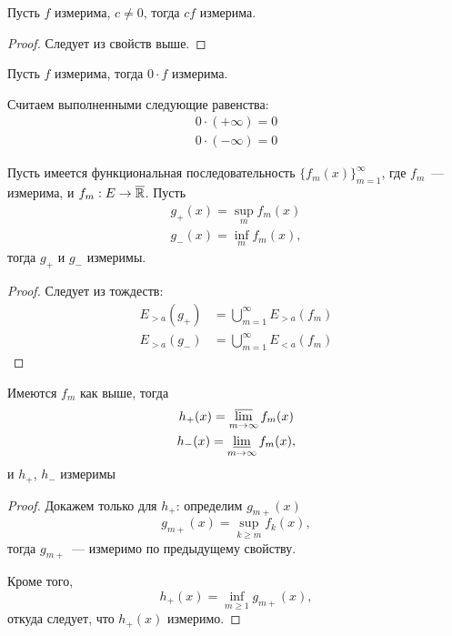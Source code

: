 \documentclass[main]{subfiles}
\begin{document}
\begin{property}
    Пусть $f$ измерима, $c \neq 0$, тогда $cf$ измерима.
\end{property}
\begin{proof}
    Следует из свойств выше.
\end{proof}

\begin{property}
    Пусть $f$ измерима, тогда $0 \cdot f$ измерима.
\end{property}

\begin{remark}
    Считаем выполненными следующие равенства:
    \begin{gather*}
        0 \cdot(+\infty) = 0\\
        0 \cdot(-\infty) = 0
    \end{gather*}
\end{remark}

\begin{property}
    Пусть имеется функциональная последовательность $\{f_m(x)\}_{m=1}^\infty$, где $f_m$~--- измерима, и $f_m: E \to \overline{\mathbb{R}}$.
    Пусть
    \begin{gather*}
        g_{+}(x) = \sup_{m} f_m(x) \\
        g_{-}(x) = \inf_{m} f_m(x),
    \end{gather*}
    тогда $g_+$ и $g_-$ измеримы.
\end{property}
\begin{proof}
    Следует из тождеств:
    \[\begin{aligned}
            E_{>a} (g_+) & = \bigcup_{m=1}^\infty E_{>a}(f_m) \\
            E_{>a} (g_-) & = \bigcup_{m=1}^\infty E_{<a}(f_m)
        \end{aligned}\tag{2}\]
\end{proof}

\begin{property}
    Имеются $f_m$ как выше, тогда
    \begin{gather*}
        h_+(x) = \varlimsup_{m \to \infty} f_m(x) \\
        h_-(x) = \varliminf_{m \to \infty} f_m(x),
    \end{gather*}
    и $h_+$, $h_-$ измеримы
\end{property}
\begin{proof}
    Докажем только для $h_+$: определим $g_{m+}(x)$
    \[g_{m+} (x) = \sup_{k\ge m} f_k(x),\]
    тогда $g_{m+}$~--- измеримо по предыдущему свойству.

    Кроме того,
    \[h_+(x) = \inf_{m \ge 1} g_{m+}(x), \tag{3}\]
    откуда следует, что $h_+(x)$ измеримо.
\end{proof}
\end{document}
